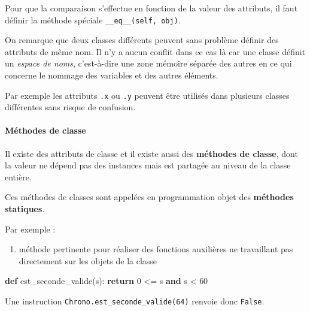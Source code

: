 \documentclass[a4paper,17pt]{extarticle}
\providecommand{\tightlist}{%
      \setlength{\itemsep}{0pt}\setlength{\parskip}{0pt}}
\newenvironment{Shaded}{}{}
\newcommand{\KeywordTok}[1]{\textcolor[rgb]{0.00,0.44,0.13}{\textbf{{#1}}}}
\newcommand{\DecValTok}[1]{\textcolor[rgb]{0.25,0.63,0.44}{{#1}}}
\newcommand{\NormalTok}[1]{{#1}}
\newcommand{\ControlFlowTok}[1]{\textcolor[rgb]{0.00,0.44,0.13}{\textbf{{#1}}}}
\newcommand{\OperatorTok}[1]{\textcolor[rgb]{0.40,0.40,0.40}{{#1}}}
\begin{document}
Pour que la comparaison s'effectue en fonction de la valeur des
attributs, il faut définir la méthode spéciale
\texttt{\_\_eq\_\_(self,\ obj)}.
\begin{remarque}
    On remarque que deux classes différents peuvent sans problème définir
des attributs de même nom. Il n'y a aucun conflit dans ce cas là car une
classe définit un \emph{espace de noms}, c'est-à-dire une zone mémoire
séparée des autres en ce qui concerne le nommage des variables et des
autres éléments.

Par exemple les attributs \texttt{.x} ou \texttt{.y} peuvent être
utilisés dans plusieurs classes différentes sans risque de confusion.

        \end{remarque}\begin{retenir}
    \hypertarget{muxe9thodes-de-classe}{%
\paragraph{Méthodes de classe}\label{muxe9thodes-de-classe}}

Il existe des attributs de classe et il existe aussi des
\textbf{méthodes de classe}, dont la valeur ne dépend pas des instances
mais est partagée au niveau de la classe entière.

Ces méthodes de classes sont appelées en programmation objet des
\textbf{méthodes statiques}.

        \end{retenir}\begin{exemple}
    Par exemple :

\begin{enumerate}
\def\labelenumi{(\arabic{enumi})}
\tightlist
\item
  méthode pertinente pour réaliser des fonctions auxilières ne
  travaillant pas directement sur les objets de la classe
\end{enumerate}

\begin{Shaded}
\begin{Highlighting}[]
\KeywordTok{def}\NormalTok{ est\_seconde\_valide(s):}
    \ControlFlowTok{return} \DecValTok{0} \OperatorTok{\textless{}=}\NormalTok{ s }\KeywordTok{and}\NormalTok{ s }\OperatorTok{\textless{}} \DecValTok{60}
\end{Highlighting}
\end{Shaded}

Une instruction \texttt{Chrono.est\_seconde\_valide(64)} renvoie donc
\texttt{False}.


\end{exemple}
\end{document}
